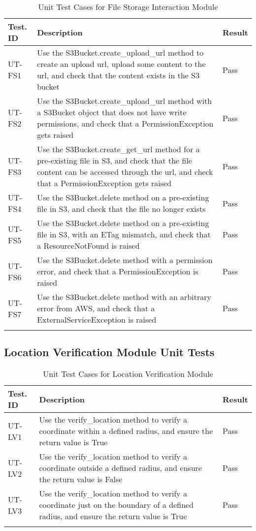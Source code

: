 \documentclass[12pt, titlepage]{article}
\begin{document}
\begin{longtable}{|m{2cm}|m{10cm}|m{1.4cm}|}
  \hline
  \textbf{Test. ID} & \textbf{Description} & \textbf{Result} \\ \hline
  UT-FS1 & Use the S3Bucket.create\_upload\_url method to create an
  upload url, upload some content to the url, and check that the
  content exists in the S3 bucket & Pass\\ \hline
  UT-FS2 & Use the S3Bucket.create\_upload\_url method with a
  S3Bucket object that does not have write permissions, and check
  that a PermissionException gets raised & Pass\\ \hline
  UT-FS3 & Use the S3Bucket.create\_get\_url method for a
  pre-existing file in S3, and check that the file content can be
  accessed through the url, and check that a PermissionException gets
  raised & Pass\\ \hline
  UT-FS4 & Use the S3Bucket.delete method on a pre-existing file in
  S3, and check that the file no longer exists & Pass\\ \hline
  UT-FS5 & Use the S3Bucket.delete method on a pre-existing file in
  S3, with an ETag mismatch, and check that a ResourceNotFound is
  raised & Pass\\ \hline
  UT-FS6 & Use the S3Bucket.delete method with a permission error,
  and check that a PermissionException is raised & Pass\\ \hline
  UT-FS7 & Use the S3Bucket.delete method with an arbitrary error
  from AWS, and check that a ExternalServiceException is raised & Pass\\ \hline
  \caption{Unit Test Cases for File Storage Interaction Module}
\end{longtable}

\subsection{Location Verification Module Unit Tests}

\begin{longtable}{|m{2cm}|m{10cm}|m{1.4cm}|}
  \hline
  \textbf{Test. ID} & \textbf{Description} & \textbf{Result} \\ \hline
  UT-LV1 & Use the verify\_location method to verify a coordinate
  within a defined radius, and ensure the return value is True & Pass\\ \hline
  UT-LV2 & Use the verify\_location method to verify a coordinate
  outside a defined radius, and ensure the return value is False & Pass\\ \hline
  UT-LV3 & Use the verify\_location method to verify a coordinate
  just on the boundary of a defined radius, and ensure the return
  value is True & Pass\\ \hline
  \caption{Unit Test Cases for Location Verification Module}
\end{longtable}
\end{document}

